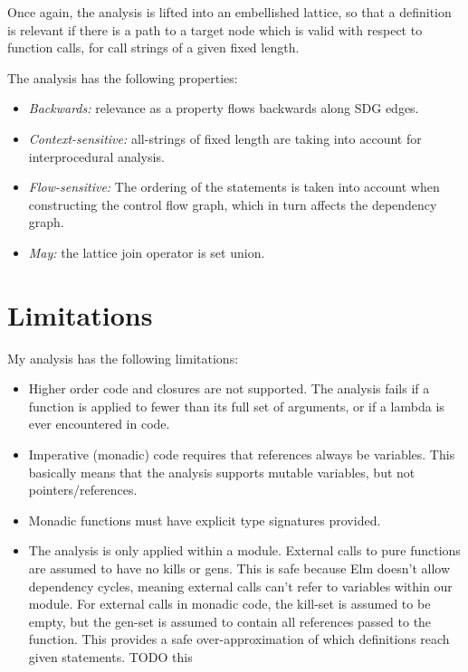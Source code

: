\documentclass{article}
\begin{document}
Once again, the analysis is lifted into an embellished lattice, so that a definition is relevant if there is a path to a target node which is valid with respect to function calls, for call strings of a given fixed length.

The analysis has the following properties:

\begin{itemize}
\item \textit{Backwards:} relevance as a property flows backwards along SDG edges.
\item \textit{Context-sensitive:} all-strings of fixed length are taking into account for interprocedural analysis.
\item \textit{Flow-sensitive:} The ordering of the  statements is taken into account when constructing the control flow graph, which in turn affects the dependency graph.
\item \textit{May:} the lattice join operator is set union.
\end{itemize}



\section{Limitations}

My analysis has the following limitations:

\begin{itemize}
\item
  Higher order code and closures are not supported. The analysis fails if a function is applied to fewer than its full set of arguments, or if a lambda is ever encountered in code.
\item
  Imperative (monadic) code requires that references always be variables. This basically means that the analysis supports mutable variables, but not pointers/references.
\item Monadic functions must have explicit type signatures provided.
\item
  The analysis is only applied within a module. External calls to pure functions are assumed to have no kills or gens. This is safe because Elm doesn't allow dependency cycles, meaning external calls can't refer to variables within our module. For external calls in monadic code, the kill-set is assumed to be empty, but the gen-set is assumed to contain all references passed to the function. This provides a safe over-approximation of which definitions reach given statements. TODO this
\end{itemize}
\end{document}
